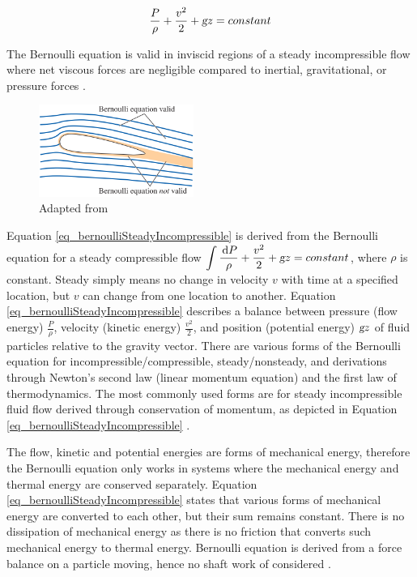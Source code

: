 \documentclass{article}
\newcommand{\ud}{\,\mathrm{d}}
\begin{document}
\begin{equation}
\frac{P}{\rho} + \frac{v^2}{2} + \textsl{g} z = constant
\label{eq_bernoulliSteadyIncompressible}
\end{equation}

The Bernoulli equation is valid in inviscid regions of a steady incompressible flow where net viscous forces are negligible compared to inertial, gravitational, or pressure forces \cite{White2011}.

\begin{figure}[h!]
\centering
\includegraphics[width=0.45\textwidth]{./img/bermoulliInviscidRegions.png}
\caption{Adapted from \cite{White2011}}
\label{fig:universe}
\end{figure}

Equation \ref{eq_bernoulliSteadyIncompressible} is derived from the Bernoulli equation for a steady compressible flow $\displaystyle \int \frac{\ud P}{\rho} + \frac{v^2}{2} + \textsl{g} z = constant$, where $\rho$ is constant. Steady simply means no change in velocity $v$ with time at a specified location, but $v$ can change from one location to another. Equation \ref{eq_bernoulliSteadyIncompressible} describes a balance between pressure (flow energy) $\displaystyle \frac{P}{\rho}$, velocity (kinetic energy) $\displaystyle \frac{v^2}{2}$, and position (potential energy) $\textsl{g} z$ of fluid particles relative to the gravity vector. There are various forms of the Bernoulli equation for incompressible/compressible, steady/nonsteady, and derivations through Newton's second law (linear momentum equation) and the first law of thermodynamics. The most commonly used forms are for steady incompressible fluid flow derived through conservation of momentum, as depicted in Equation \ref{eq_bernoulliSteadyIncompressible} \cite{White2011}.

The flow, kinetic and potential energies are forms of mechanical energy, therefore the Bernoulli equation only works in systems where the mechanical energy and thermal energy are conserved separately. Equation \ref{eq_bernoulliSteadyIncompressible} states that various forms of mechanical energy are converted to each other, but their sum remains constant. There is no dissipation of mechanical energy as there is no friction that converts such mechanical energy to thermal energy. Bernoulli equation is derived from a force balance on a particle moving, hence no shaft work of considered \cite{White2011}.
\end{document}
